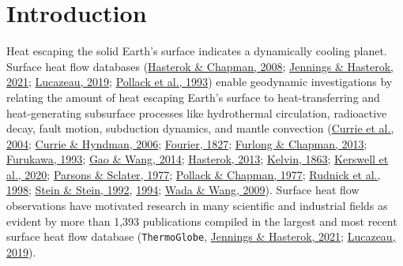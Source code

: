 \hypertarget{chpt3Intro}{%
\section{Introduction}\label{chpt3Intro}}

Heat escaping the solid Earth's surface indicates a dynamically cooling planet. Surface heat flow databases (\protect\hyperlink{ref-hasterok2008}{Hasterok \& Chapman, 2008}; \protect\hyperlink{ref-jennings2021}{Jennings \& Hasterok, 2021}; \protect\hyperlink{ref-lucazeau2019}{Lucazeau, 2019}; \protect\hyperlink{ref-pollack1993}{Pollack et al., 1993}) enable geodynamic investigations by relating the amount of heat escaping Earth's surface to heat-transferring and heat-generating subsurface processes like hydrothermal circulation, radioactive decay, fault motion, subduction dynamics, and mantle convection (\protect\hyperlink{ref-currie2004}{Currie et al., 2004}; \protect\hyperlink{ref-currie2006}{Currie \& Hyndman, 2006}; \protect\hyperlink{ref-fourier1827}{Fourier, 1827}; \protect\hyperlink{ref-furlong2013}{Furlong \& Chapman, 2013}; \protect\hyperlink{ref-furukawa1993}{Furukawa, 1993}; \protect\hyperlink{ref-gao2014}{Gao \& Wang, 2014}; \protect\hyperlink{ref-hasterok2013}{Hasterok, 2013}; \protect\hyperlink{ref-kelvin1863}{Kelvin, 1863}; \protect\hyperlink{ref-kerswell2020}{Kerswell et al., 2020}; \protect\hyperlink{ref-parsons1977}{Parsons \& Sclater, 1977}; \protect\hyperlink{ref-pollack1977}{Pollack \& Chapman, 1977}; \protect\hyperlink{ref-rudnick1998}{Rudnick et al., 1998}; \protect\hyperlink{ref-stein1992}{Stein \& Stein, 1992}, \protect\hyperlink{ref-stein1994}{1994}; \protect\hyperlink{ref-wada2009}{Wada \& Wang, 2009}). Surface heat flow observations have motivated research in many scientific and industrial fields as evident by more than 1,393 publications compiled in the largest and most recent surface heat flow database (\texttt{ThermoGlobe}, \protect\hyperlink{ref-jennings2021}{Jennings \& Hasterok, 2021}; \protect\hyperlink{ref-lucazeau2019}{Lucazeau, 2019}).

